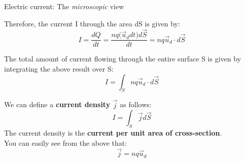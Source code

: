 \begin{frame}{Electric current: The {\em microscopic} view }

Therefore, the current I through the area dS is given by:
\begin{equation*}
  I = \frac{dQ}{dt} = \frac{n q \Big( \vec{u}_{d} dt \Big)
    d\vec{S}}{dt} = n q \vec{u}_{d} \cdot d\vec{S}
\end{equation*}

The total amount of current flowing through the entire surface S
is given by integrating the above result over S:
\begin{equation*}
  I = \int_{S} n q \vec{u}_{d} \cdot d\vec{S}
\end{equation*}

We can define a {\bf current density} $\vec{j}$ as follows:
\begin{equation*}
  I = \int_{S} \vec{j} d\vec{S}
\end{equation*}
The  current density is the {\bf current per unit area  of cross-section}.\\

You can easily see from the above that:
\begin{equation*}
  \vec{j} = n q \vec{u}_{d}
\end{equation*}

\end{frame}

%
%
%

